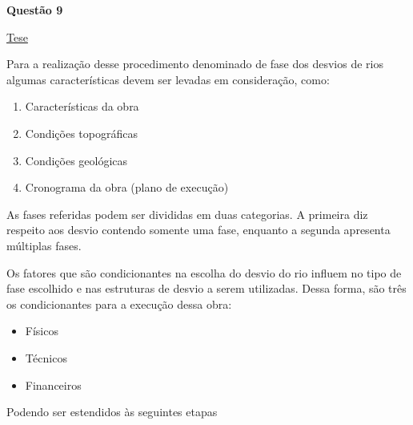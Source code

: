\item[]\textbf{Questão 9}

\href{https://www.teses.usp.br/teses/disponiveis/3/3147/tde-08122006-164741/publico/BoletimTecnicoGabrielRocha.pdf}{Tese}

Para a realização desse procedimento denominado de fase dos desvios de rios algumas características devem ser levadas em consideração, como:

\begin{enumerate}
	\item Características da obra
	\item Condições topográficas
	\item Condições geológicas
	\item Cronograma da obra (plano de execução)
\end{enumerate}

As fases referidas podem ser divididas em duas categorias. A primeira diz respeito aos desvio contendo somente uma fase, enquanto a segunda apresenta múltiplas fases.

Os fatores que são condicionantes na escolha do desvio do rio influem no tipo de fase escolhido e nas estruturas de desvio a serem utilizadas. Dessa forma, são três os condicionantes para a execução dessa obra: 

\begin{itemize}
	\item Físicos
	\item Técnicos
	\item Financeiros
\end{itemize} 

Podendo ser estendidos às seguintes etapas

